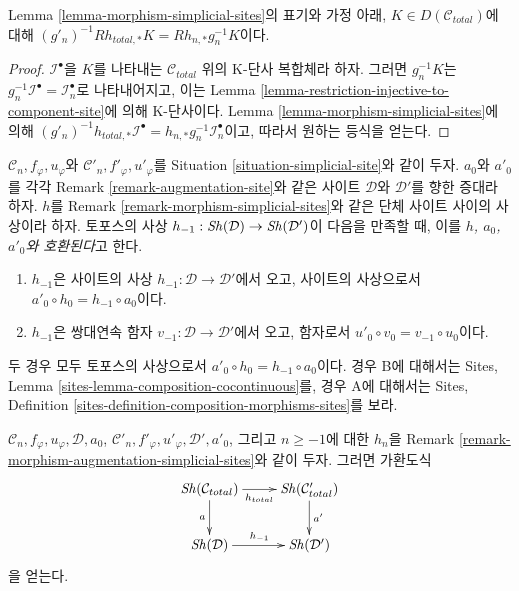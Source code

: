 \begin{lemma}
\label{lemma-direct-image-morphism-simplicial-sites}
Lemma \ref{lemma-morphism-simplicial-sites}의 표기와 가정 아래,
$K \in D(\mathcal{C}_{total})$에 대해
$(g'_n)^{-1}Rh_{total, *}K = Rh_{n, *}g_n^{-1}K$이다.
\end{lemma}

\begin{proof}
$\mathcal{I}^\bullet$을 $K$를 나타내는 $\mathcal{C}_{total}$ 위의
K-단사 복합체라 하자. 그러면 $g_n^{-1}K$는
$g_n^{-1}\mathcal{I}^\bullet = \mathcal{I}_n^\bullet$로 나타내어지고,
이는 Lemma \ref{lemma-restriction-injective-to-component-site}에 의해
K-단사이다.
Lemma \ref{lemma-morphism-simplicial-sites}에 의해
$(g'_n)^{-1}h_{total, *}\mathcal{I}^\bullet =
h_{n, *}g_n^{-1}\mathcal{I}_n^\bullet$이고, 따라서 원하는 등식을 얻는다.
\end{proof}

\begin{remark}
\label{remark-morphism-augmentation-simplicial-sites}
$\mathcal{C}_n, f_\varphi, u_\varphi$와
$\mathcal{C}'_n, f'_\varphi, u'_\varphi$를 Situation
\ref{situation-simplicial-site}와 같이 두자. $a_0$와 $a'_0$를 각각
Remark \ref{remark-augmentation-site}와 같은 사이트 $\mathcal{D}$와
$\mathcal{D}'$를 향한 증대라 하자. $h$를 Remark
\ref{remark-morphism-simplicial-sites}와 같은 단체 사이트 사이의 사상이라 하자.
토포스의 사상 $h_{-1} : \mathop{\mathit{Sh}}\nolimits(\mathcal{D}) \to \mathop{\mathit{Sh}}\nolimits(\mathcal{D}')$이
다음을 만족할 때, 이를 {\it $h$, $a_0$, $a'_0$와 호환된다}고 한다.
\begin{enumerate}
\item[(A)] $h_{-1}$은 사이트의 사상
$h_{-1} : \mathcal{D} \to \mathcal{D}'$에서 오고, 사이트의 사상으로서
$a'_0 \circ h_0 = h_{-1} \circ a_0$이다.
\item[(B)] $h_{-1}$은 쌍대연속 함자
$v_{-1} : \mathcal{D} \to \mathcal{D}'$에서 오고, 함자로서
$u'_0 \circ v_0 = v_{-1} \circ u_0$이다.
\end{enumerate}
두 경우 모두 토포스의 사상으로서
$a'_0 \circ h_0 = h_{-1} \circ a_0$이다. 경우 B에 대해서는
Sites, Lemma \ref{sites-lemma-composition-cocontinuous}를, 경우 A에 대해서는
Sites, Definition \ref{sites-definition-composition-morphisms-sites}를 보라.
\end{remark}

\begin{lemma}
\label{lemma-morphism-augmentation-simplicial-sites}
$\mathcal{C}_n, f_\varphi, u_\varphi, \mathcal{D}, a_0$,
$\mathcal{C}'_n, f'_\varphi, u'_\varphi, \mathcal{D}', a'_0$, 그리고
$n \geq -1$에 대한 $h_n$을 Remark
\ref{remark-morphism-augmentation-simplicial-sites}와 같이 두자.
그러면 가환도식
$$
\xymatrix{
\Sh(\mathcal{C}_{total}) \ar[d]_a \ar[r]_{h_{total}} &
\Sh(\mathcal{C}'_{total}) \ar[d]^{a'} \\
\Sh(\mathcal{D}) \ar[r]^{h_{-1}} &
\Sh(\mathcal{D}')
}
$$
을 얻는다.
\end{lemma}

